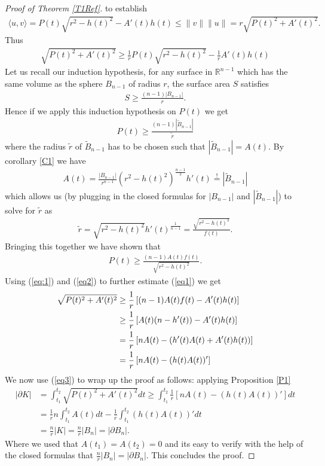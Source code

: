 \documentclass[12pt, a4paper, titlepage]{article}
\begin{document}
\begin{proof}[Proof of Theorem \ref{T1Ref}]
to establish 
\begin{align*}
 \langle u, v \rangle= P(t) \sqrt{r^2-h(t)^2} - A'(t)h(t) \leq \|v\| \|u\| = r \sqrt{P(t)^2+A'(t)^2}.
\end{align*}
\newpage
Thus 
\begin{align} \label{eq1}
\sqrt{P(t)^2 +A'(t)^2} \geq  \frac{1}{r}P(t)\sqrt{r^2-h(t)^2} - \frac{1}{r}A'(t)h(t) 
\end{align}
Let us recall our induction hypothesis, for any surface in $\mathbb{R}^{n-1}$ which has the same volume as the sphere $B_{n-1}$ of radius $r$, the surface area $S$ satisfies 
\begin{align*}
S \geq \frac{(n-1)|B_{n-1}|}{r}.
\end{align*}
Hence if we apply this induction hypothesis on $P(t)$ we get 
\begin{align*}
P(t) \geq \frac{(n-1) |\widetilde{B}_{n-1}|}{\widetilde{r}}
\end{align*}
where the radius $\widetilde{r}$ of $\widetilde{B}_{n-1}$ has to be chosen such that $|\widetilde{B}_{n-1}| = A(t)$. By corollary \ref{C1} we have  
\begin{align*}
A(t)  = \frac{|B_{n-1}|}{r^{n-1}} (r^2-h(t)^2)^\frac{n-1}{2} h'(t) \overset{!}= |\widetilde{B}_{n-1}| 
\end{align*}
which allows us (by plugging in the closed formulas for $|B_{n-1}|$ and $|\widetilde{B}_{n-1}|$) to solve for $\widetilde{r}$ as
\begin{align*}
\widetilde{r} = \sqrt{r^2-h(t)^2}h'(t)^\frac{1}{n-1} = \frac{\sqrt{r^2-h(t)^2}}{f(t)}.
\end{align*}
Bringing this together we have shown that 
\begin{align}
P(t) \geq \frac{(n-1)A(t)f(t)}{\sqrt{r^2-h(t)^2}}. \label{eq2}
\end{align}
Using (\ref{eq:1}) and (\ref{eq2}) to further estimate (\ref{eq1}) we get 
\begin{align} \label{eq3}
\sqrt{P(t)^2 +A'(t)^2} &\geq  \frac{1}{r} \left[ (n-1)A(t)f(t) - A'(t)h(t) \right] \notag \\
& \geq \frac{1}{r}\left[ A(t)(n-h'(t))- A'(t)h(t) \right] \notag  \\
&= \frac{1}{r} \left[ nA(t)- (h'(t)A(t)+A'(t)h(t)) \right] \notag \\
&= \frac{1}{r} \left[ nA(t) - (h(t)A(t))'\right]
\end{align}
\newpage
We now use (\ref{eq3}) to wrap up the proof as follows: applying Proposition \ref{P1}
\begin{align*}
| \partial K| &= \int_{t_1}^{t_2} \sqrt{P(t)^2+A'(t)^2}dt \geq \int_{t_1}^{t_2} \frac{1}{r}[nA(t)-(h(t)A(t))' ] dt \\
&= \frac{1}{r}n \int_{t_1}^{t_2} A(t)dt - \frac{1}{r} \int_{t_1}^{t_2} (h(t)A(t))'dt  \\
&= \frac{n}{r} |K| = \frac{n}{r}|B_n| = | \partial B_n|.
\end{align*}
Where we used that $A(t_1)=A(t_2)=0$ and its easy to verify with the help of the closed formulas that $\frac{n}{r}|B_n|= | \partial B_n|$. This concludes the proof. 
\end{proof}
\end{document}
